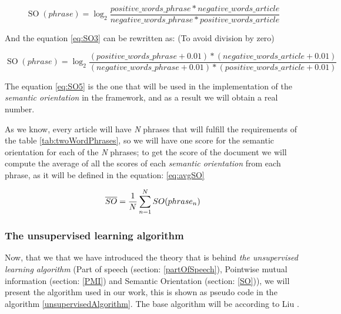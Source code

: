 \begin{equation} \label{eq:SO4}
\operatorname{SO}(phrase) = \log_{2}\frac{positive\_words\_phrase * negative\_words\_article}{negative\_words\_phrase * positive\_words\_article}
\end{equation}

And the equation \ref{eq:SO3} can be rewritten as: (To avoid division by zero)

\begin{equation} \label{eq:SO5}
\operatorname{SO}(phrase) = \log_{2}\frac{(positive\_words\_phrase+0.01) * (negative\_words\_article+0.01)}{(negative\_words\_phrase+0.01) * (positive\_words\_article+0.01)}
\end{equation}

The equation \ref{eq:SO5} is the one that will be used in the implementation of the \emph{semantic orientation} in the framework, and as a result we will obtain a real number.

As we know, every article will have \emph{N} phrases that will fulfill the requirements of the table \ref{tab:twoWordPhrases}, so we will have one score for the semantic orientation for each of the \emph{N} phrases; to get the score of the document we will compute the average of all the scores of each \emph{semantic orientation} from each phrase, as it will be defined in the equation: \ref{eq:avgSO}

\begin{equation} \label{eq:avgSO}
\overline{SO} = \frac {1}{N} \sum_{n=1}^{N} SO(phrase_n) \\	
\end{equation}


\subsubsection{The unsupervised learning algorithm}\label{theUnsuervisedAlgorithm}

Now, that we that we have introduced the theory that is behind \emph{the unsupervised learning algorithm} (Part of speech (section: \ref{partOfSpeech}), Pointwise mutual information (section: \ref{PMI}) and Semantic Orientation (section: \ref{SO})), we will present the algorithm used in our work, this is shown as pseudo code in the algorithm \ref{unsupervisedAlgorithm}. The base algorithm will be according to Liu \cite%
{L2011}.

